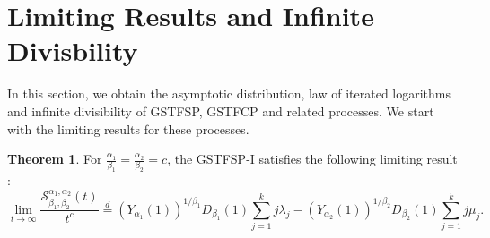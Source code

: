 \documentclass[11pt,oneside,reqno]{amsart}
\theoremstyle{definition}
\newtheorem{theorem}{\bf Theorem}[section]
\theoremstyle{remarkstyle}
\begin{document}
\section{Limiting Results and Infinite Divisbility}\label{sec 8}
In this section, we obtain the asymptotic distribution, law of iterated logarithms and infinite divisibility of GSTFSP, GSTFCP and related processes. We start with the limiting results for these processes. 
\begin{theorem}
  For $\frac{\alpha_1}{\beta_1}=\frac{\alpha_2}{\beta_2}=c$, the GSTFSP-I satisfies the following limiting result :
\begin{equation*}
\lim_{t\rightarrow\infty}\frac{\mathcal{S}_{\beta_1,\beta_2}^{\alpha_1,\alpha_2}(t)}{t^{c}} \overset{d}{=}(Y_{\alpha_1}(1))^{1/\beta_1}D_{\beta_1}(1)\sum_{j=1}^{k}j\lambda_j-(Y_{\alpha_2}(1))^{1/\beta_2}D_{\beta_2}(1)\sum_{j=1}^{k}j\mu_j.
\end{equation*}
\end{theorem}
\end{document}
